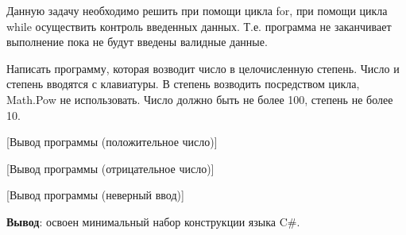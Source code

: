 \documentclass{bsuir}
\newcommand{\csharp}{C{\liberationrm\#}}
\begin{document}
    Данную задачу необходимо решить при помощи цикла for, при помощи цикла while
    осуществить контроль введенных данных. Т.е. программа не заканчивает выполнение
    пока не будут введены валидные данные.

    Написать программу, которая возводит число в целочисленную степень. Число и
    степень вводятся с клавиатуры. В степень возводить посредством цикла, Math.Pow
    не использовать. Число должно быть не более 100, степень не более 10.


    [Вывод программы (положительное число)]

    [Вывод программы (отрицательное число)]

    [Вывод программы (неверный ввод)]

    \textbf{Вывод}: освоен минимальный набор конструкции языка \csharp.
\end{document}

